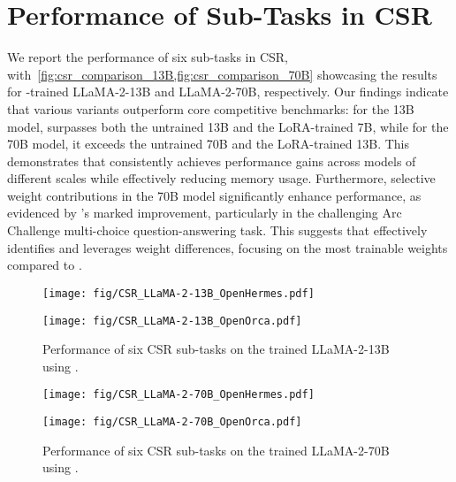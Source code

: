 \section{Performance of Sub-Tasks in CSR}
\label{apd:detail_csr}
We report the performance of six sub-tasks in CSR, with~\cref{fig:csr_comparison_13B,fig:csr_comparison_70B} showcasing the results for \method-trained LLaMA-2-13B and LLaMA-2-70B, respectively. Our findings indicate that various \method variants outperform core competitive benchmarks: for the 13B model, \method surpasses both the untrained 13B and the LoRA-trained 7B, while for the 70B model, it exceeds the untrained 70B and the LoRA-trained 13B. This demonstrates that \method consistently achieves performance gains across models of different scales while effectively reducing memory usage. Furthermore, selective weight contributions in the 70B model significantly enhance performance, as evidenced by \methodstru's marked improvement, particularly in the challenging Arc Challenge multi-choice question-answering task. This suggests that \methodstru effectively identifies and leverages weight differences, focusing on the most trainable weights compared to \methodrand.
\begin{figure}[ht]
    \centering
    \begin{minipage}[b]{0.5\textwidth}
        \centering
        \texttt{[image: fig/CSR\_LLaMA-2-13B\_OpenHermes.pdf]}
\label{fig:csr_detail_13B_hermes}
    \end{minipage}%
    \begin{minipage}[b]{0.5\textwidth}
        \centering
        \texttt{[image: fig/CSR\_LLaMA-2-13B\_OpenOrca.pdf]}     \label{fig:csr_detail_13B_orca}
    \end{minipage}
    \caption{Performance of six CSR sub-tasks on the trained LLaMA-2-13B using \method.}
    \label{fig:csr_comparison_13B}
\begin{minipage}[b]{0.5\textwidth}
        \centering
        \texttt{[image: fig/CSR\_LLaMA-2-70B\_OpenHermes.pdf]}
\label{fig:csr_detail_70B_hermes}
    \end{minipage}%
    \begin{minipage}[b]{0.5\textwidth}
        \centering
        \texttt{[image: fig/CSR\_LLaMA-2-70B\_OpenOrca.pdf]}     \label{fig:csr_detail_70B_orca}
    \end{minipage}
    \caption{Performance of six CSR sub-tasks on the trained LLaMA-2-70B using \method.}
    \label{fig:csr_comparison_70B}
\end{figure}

